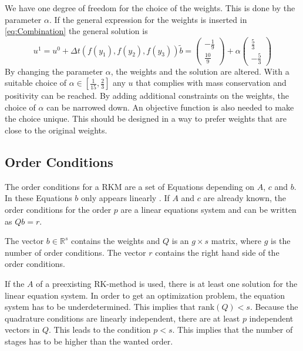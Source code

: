 \documentclass[a4paper]{article}
\numberwithin{equation}{section}
\theoremstyle{plain}
\theoremstyle{definition}
\numberwithin{theorem}{section}
\newcommand{\R}{\mathbb{R}}
\newcommand{\dt}{{\Delta t}}
\newcommand{\1}{\mathbbm{1}}
\begin{document}
We have one degree of freedom for the choice of the weights. This is done by the parameter $\alpha$.
If the general expression for the weights is inserted in \eqref{eq:Combination} the general solution is 
\begin{equation}
u^{1} = u^0 + \dt  \left(f(y_1),f(y_2),f(y_3)\right) \tilde{b} =
\left(\begin{matrix}- \frac{1}{9}\\\frac{10}{9}\end{matrix}\right) +\alpha \left(\begin{matrix}\frac{5}{3}\\- \frac{5}{3}\end{matrix}\right)
\end{equation}
By changing the parameter $\alpha$, the weights and the solution are altered.
With a suitable choice of $\alpha \in \left[\frac{1}{15},\frac{2}{3}\right]$ any $u$ that complies with mass conservation and positivity can be reached. 
By adding additional constraints on the weights, the choice of $\alpha$ can be narrowed down. 
An objective function is also needed to make the choice unique. This should be designed in a way to prefer weights that are close to the original weights.







\subsection{Order Conditions}\label{sec:OrderCond}

The order conditions for a RKM are a set of Equations depending on $A$, $c$ and $b$. In these Equations $b$ only appears linearly \cite{hairer_solving_1993}.
If $A$ and $c$ are already known, the order conditions for the order $p$ are a linear equations system and can be written as $Q b = r$. 

The vector $b \in \R^s$ contains the weights and $Q$ is an $g \times s$ matrix, where $g$ is the number of order conditions. The vector $r$ contains the right hand side of the order conditions.

If the $A$ of a preexisting RK-method is used, there is at least one solution for the linear equation system.
In order to get an optimization problem, the equation system has to be underdetermined.
This implies that $\mathrm{rank}(Q) < s$. 
Because the quadrature conditions are linearly independent, there are at least $p$ independent vectors in $Q$. This leads to the condition $p < s$.
This implies that the number of stages has to be higher than the wanted order.
\end{document}
